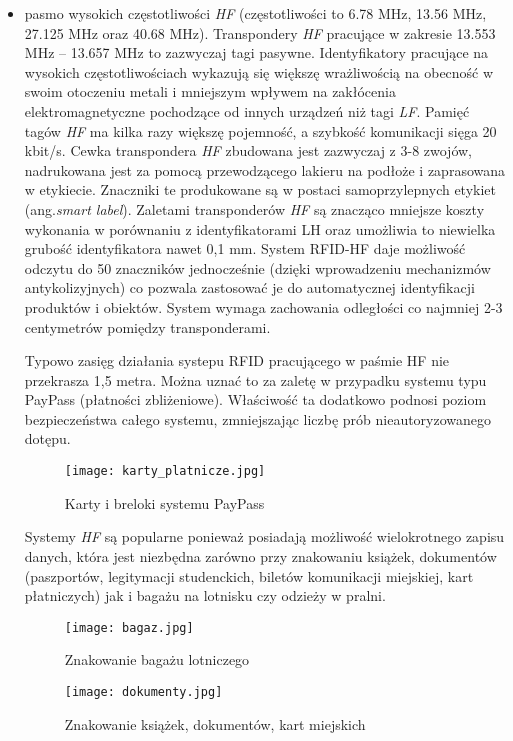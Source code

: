 \begin{itemize}
	\item pasmo wysokich częstotliwości \emph{HF} (częstotliwości to 6.78 MHz, 13.56 MHz, 27.125 MHz oraz 40.68 MHz). 
Transpondery \emph{HF} pracujące w zakresie 13.553 MHz – 13.657 MHz to zazwyczaj tagi pasywne. Identyfikatory pracujące na wysokich częstotliwościach wykazują się większę wrażliwością na obecność w swoim otoczeniu metali i mniejszym wpływem na zakłócenia elektromagnetyczne pochodzące od innych urządzeń niż tagi \emph{LF}. Pamięć tagów \emph{HF} ma kilka razy większę pojemność, a szybkość komunikacji sięga 20 kbit/s. Cewka transpondera \emph{HF} zbudowana jest zazwyczaj z 3-8 zwojów, nadrukowana jest za pomocą przewodzącego lakieru na podłoże i zaprasowana w etykiecie. Znaczniki te produkowane są w postaci samoprzylepnych etykiet (ang.\emph{smart label}). Zaletami transponderów \emph{HF} są znacząco mniejsze koszty wykonania w porównaniu z identyfikatorami LH oraz umożliwia to niewielka grubość identyfikatora nawet 0,1 mm. System RFID-HF daje możliwość odczytu do 50 znaczników jednocześnie (dzięki wprowadzeniu mechanizmów antykolizyjnych) co pozwala zastosować je do automatycznej identyfikacji produktów i obiektów. System wymaga zachowania odległości co najmniej 2-3 centymetrów pomiędzy transponderami. 
	
	Typowo zasięg działania systepu RFID pracującego w paśmie HF nie przekrasza 1,5 metra. Można uznać to za zaletę w przypadku systemu typu PayPass (płatności zbliżeniowe). Właściwość ta dodatkowo podnosi poziom bezpieczeństwa całego systemu, zmniejszając liczbę prób nieautoryzowanego dotępu.  

	\begin{figure}[h!]
	\centering
	    \texttt{[image: karty\_platnicze.jpg]}
	    \caption{Karty i breloki systemu PayPass}
	\end{figure}

	Systemy \emph{HF} są popularne ponieważ posiadają możliwość wielokrotnego zapisu danych, która jest niezbędna zarówno przy znakowaniu książek, dokumentów (paszportów, legitymacji studenckich, biletów komunikacji miejskiej, kart płatniczych) jak i bagażu na lotnisku czy odzieży w pralni.

	\begin{figure}[h!]
	\centering
	    \texttt{[image: bagaz.jpg]}
	    \caption{Znakowanie bagażu lotniczego}
	\end{figure}

	\begin{figure}[h!]
	\centering
	    \texttt{[image: dokumenty.jpg]}
	    \caption{Znakowanie książek, dokumentów, kart miejskich}
	\end{figure}
	

\end{itemize}
